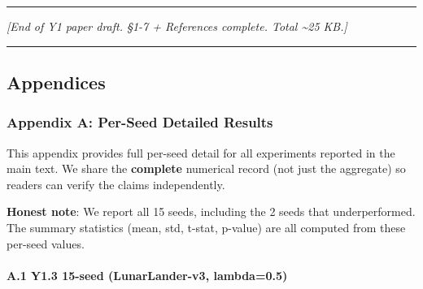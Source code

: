 \documentclass[
]{article}
\begin{document}
\begin{center}\rule{0.5\linewidth}{0.5pt}\end{center}

\emph{{[}End of Y1 paper draft. §1-7 + References complete. Total
\textasciitilde25 KB.{]}}

\begin{center}\rule{0.5\linewidth}{0.5pt}\end{center}

\subsection{Appendices}\label{appendices}

\subsubsection{Appendix A: Per-Seed Detailed
Results}\label{appendix-a-per-seed-detailed-results}

This appendix provides full per-seed detail for all experiments reported
in the main text. We share the \textbf{complete} numerical record (not
just the aggregate) so readers can verify the claims independently.

\textbf{Honest note}: We report all 15 seeds, including the 2 seeds that
underperformed. The summary statistics (mean, std, t-stat, p-value) are
all computed from these per-seed values.

\paragraph{A.1 Y1.3 15-seed (LunarLander-v3,
lambda=0.5)}\label{a.1-y1.3-15-seed-lunarlander-v3-lambda0.5}
\end{document}
